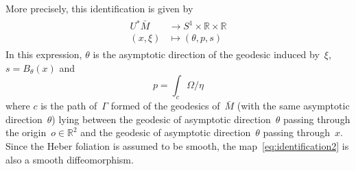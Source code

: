 \documentclass[AHL,Unicode,longabstracts,published]{cedram}
\newcommand{\LL}{\mathcal{L}}
\newcommand{\R}{\mathbb{R}}
\begin{document}
More precisely, this identification is given by
\begin{align}\label{eq:identification2}
\begin{split}
U^*\bar{M} & \rightarrow S^1 \times \R \times \R \\
(x,\xi) & \mapsto (\theta,p,s)
\end{split}
\end{align}
In this expression, $\theta$ is the asymptotic direction of the geodesic induced by~$\xi$, \mbox{$s=B_\theta(x)$} and
\[
p = \int_c \Omega/\eta
\]
where $c$ is the path of~$\Gamma$ formed of the geodesics of~$\bar{M}$ (with the same asymptotic direction~$\theta$) lying between the geodesic of asymptotic direction~$\theta$ passing through the origin~$o \in \R^2$ and the geodesic of asymptotic direction~$\theta$ passing through~$x$. Since the Heber foliation is assumed to be smooth, the map~\eqref{eq:identification2} is also a smooth diffeomorphism.

\end{document}
